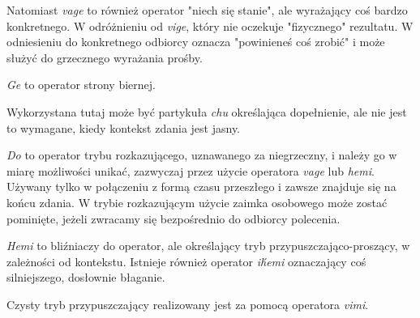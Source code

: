 
Natomiast \emph{vage} to również operator "niech się stanie", ale wyrażający coś
bardzo konkretnego. W odróżnieniu od \emph{vige}, który nie oczekuje 
"fizycznego" rezultatu. W odniesieniu do konkretnego odbiorcy oznacza 
"powinieneś coś zrobić" i może służyć do grzecznego wyrażania prośby.




\emph{Ge} to operator strony biernej.


Wykorzystana tutaj może być partykuła \emph{chu} określająca dopełnienie, ale 
nie jest to wymagane, kiedy kontekst zdania jest jasny.


\skipline

\emph{Do} to operator trybu rozkazującego, uznawanego za niegrzeczny, i należy 
go w miarę możliwości unikać, zazwyczaj przez użycie operatora \emph{vage} lub 
\emph{hemi}. Używany tylko w połączeniu z formą czasu przeszłego i zawsze 
znajduje się na końcu zdania. W trybie rozkazującym użycie zaimka osobowego 
może zostać pominięte, jeżeli zwracamy się bezpośrednio do odbiorcy polecenia.



\emph{Hemi} to bliźniaczy do operator, ale określający tryb 
przypuszczająco-proszący, w zależności od kontekstu. Istnieje również operator 
\emph{ih́emi} oznaczający coś silniejszego, dosłownie błaganie.



Czysty tryb przypuszczający realizowany jest za pomocą operatora \emph{vimi}.

